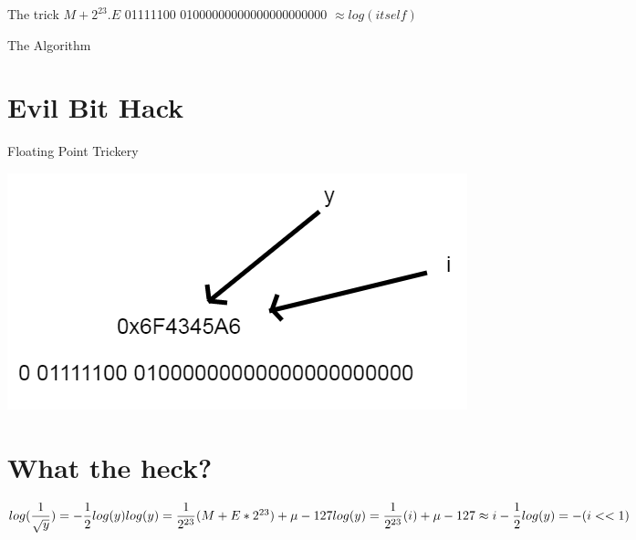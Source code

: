 \documentclass[10pt]{beamer}
\begin{document}
\begin{frame}{The trick}
     $M + {2}^{23}.E$ \hspace{12mm} 01111100 \hspace{1mm} 01000000000000000000000
     \newline
     \newline
     \hspace{100}
     $ 
     \approx log(itself)
     $
\end{frame}

\begin{frame}{The Algorithm}

\end{frame}

\section{Evil Bit Hack}

\begin{frame}{Floating Point Trickery}
\begin{multicols}{2}

\columnbreak
\includegraphics[scale=0.3]{images/pointers.png}
\end{multicols}
\end{frame}

\section{What the heck?}

\begin{frame}[fragile]{}
    
    $ 
    log(\dfrac{1}{\sqrt{y}}) = -\dfrac{1}{2}log(y)
    \newline
    \newline
    log(y) = \dfrac{1}{{2}^{23}}(M + E * {2}^{23}) + \mu - 127
    \newline
    \newline
    log(y) = \dfrac{1}{{2}^{23}}(i) + \mu - 127 \approx i
    \newline
    \newline
    -\dfrac{1}{2}log(y) = - (i << 1)
    $
\end{frame}
\end{document}
